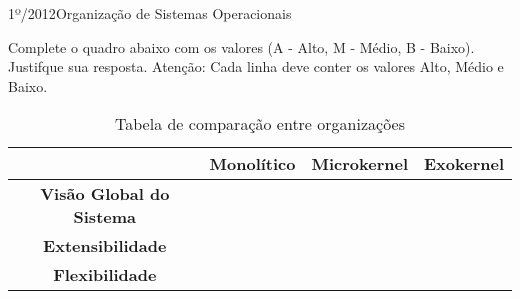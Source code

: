 \begin{exercicio}
  {1º/2012}{Organização de Sistemas Operacionais}
  {Complete o quadro abaixo com os valores (A - Alto, M - Médio, B - Baixo). Justifque sua resposta. Atenção: Cada linha deve conter os valores Alto, Médio e Baixo.
  \begin{table}[!h]
    \centering
    \begin{tabular}{clll}
      \hline \hline
      \multicolumn{1}{l}{}             & \multicolumn{1}{c}{\textbf{Monolítico}} & \multicolumn{1}{c}{\textbf{Microkernel}} & \multicolumn{1}{c}{\textbf{Exokernel}} \\ \hline
      \textbf{Visão Global do Sistema} &&& \\
      \textbf{Extensibilidade} &&& \\
      \textbf{Flexibilidade} &&& \\
      \hline \hline
    \end{tabular}
    \caption{Tabela de comparação entre organizações}
    \label{tab:ex15}
    \end{table}}
\end{exercicio}
